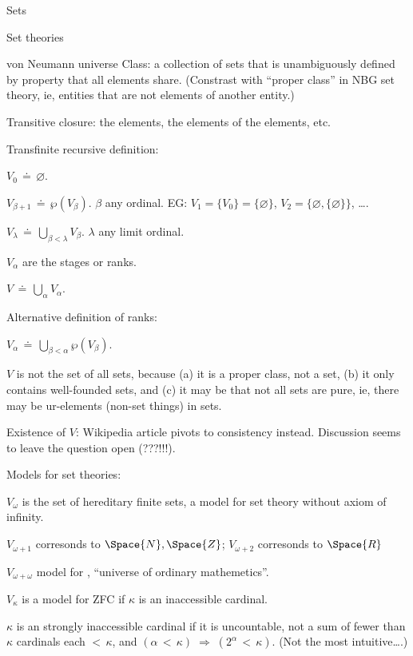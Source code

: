 \begin{plSection}{Sets}
\begin{plSection}{Set theories}
\begin{plSection}{von Neumann universe}
Class\cite{wiki:ClassSetTheory}:
a collection of sets that is unambiguously defined
by property that all elements share. 
(Constrast with ``proper class'' 
in NBG set theory\cite{wiki:NBGSetTheory},
ie, entities that are not elements of another entity.)

Transitive closure: the elements, the elements of the elements,
etc.

Transfinite recursive definition:

$V_{0} \,\doteq\, \varnothing$.

$V_{\beta +1} \,\doteq\, \wp(V_{\beta })$.
$\beta$ any ordinal\cite{wiki:OrdinalNumber}.
EG: $V_1 = \{ V_0 \} = \{ \varnothing \}$,
 $V_2 = \{ \varnothing,  \{ \varnothing \} \}$, \ldots .

$V_{\lambda }\,\doteq\,\bigcup _{\beta <\lambda }V_{\beta }$.
$\lambda$ any limit ordinal\cite{wiki:LimitOrdinal}.

$V_{\alpha}$ are the stages or ranks.

$V\,\doteq\,\bigcup _{\alpha }V_{\alpha }$.

Alternative definition of ranks:

$V_{\alpha }
\,\doteq\,
\bigcup _{\beta <\alpha }\wp(V_{\beta })$.

$V$ is not the set of all sets, 
because (a) it is a proper class, not a set,
(b) it only contains well-founded sets,
and (c) it may be that not all sets are pure,
ie, there may be ur-elements (non-set things) in sets.

Existence of $V$: Wikipedia article pivots to consistency instead.
Discussion seems to leave the question open (???!!!).
 

Models for set theories:

$V_{\omega}$ is the set of hereditary finite sets,
a model for set theory without axiom of infinity.

$V_{\omega+1}$ corresonds to $\Space{N}, \Space{Z}$;
$V_{\omega+2}$ corresonds to $\Space{R}$
 
$V_{\omega+\omega}$ model for ,
``universe of ordinary mathemetics''.

$V_{\kappa}$ is a model for \textsf{ZFC} 
if $\kappa$ is an inaccessible cardinal\cite{wiki:InaccessibleCardinal}.

$\kappa$ is an strongly inaccessible cardinal 
if it is uncountable, 
not a sum of fewer than $\kappa$ cardinals each $<\,\kappa$,
and
$(\alpha \,<\, \kappa) \;\Rightarrow\; (2^{\alpha}\,<\,\kappa)$.
(Not the most intuitive\ldots .)


\end{plSection}
\end{plSection}
\end{plSection}
